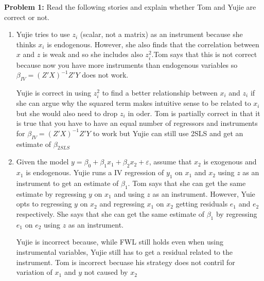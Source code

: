 \documentclass[11pt]{SelfArxOneColBMN}
\affiliation{\textsuperscript{1}\textit{John E. Walker Department of Economics,
Clemson University,Clemson, SC: email ijdavis@g.clemson.edu}}
\date{\small{Version ~\today}}
\begin{document}
\flushbottom

\maketitle

\textbf{Problem 1:} Read the following stories and explain whether Tom and Yujie are correct or not.
\begin{enumerate}
  \item Yujie tries to use $z_i$ (scalar, not a matrix) as an instrument because she thinks $x_i$ is endogenous. However, she also finds that the correlation between $x$ and $z$ is weak and so she includes also $z_i^2$.Tom says that this is not correct because now you have more instruments than endogenous variables so $\beta_{IV} = (Z'X)^{-1}Z'Y$ does not work.
  
  \begin{solution}
    Yujie is correct in using $z_i^2$ to find a better relationship between $x_i$ and $z_i$ if she can argue why the squared term makes intuitive sense to be related to $x_i$ but she would also need to drop $z_i$ in oder. Tom is partially correct in that it is true that you have to have an equal number of regressors and instruments for $\beta_{IV} = (Z'X)^{-1}Z'Y$ to work but Yujie can still use 2SLS and get an estimate of $\beta_{2SLS}$
  \end{solution}
  
  \item Given the model $y = \beta_0 + \beta_1x_1 + \beta_2x_2 + \varepsilon$, assume that $x_2$ is exogenous and $x_1$ is endogenous. Yujie runs a IV regression of $y_1$ on $x_1$ and $x_2$ using $z$ as an instrument to get an estimate of $\beta_1$. Tom says that she can get the same estimate by regressing $y$ on $x_1$ and using $z$ as an instrument. However, Yuie opts to regressing $y$ on $x_2$ and regressing $x_1$ on $x_2$ getting residuals $e_1$ and $e_2$ respectively. She says that she can get the same estimate of $\beta_1$ by regressing $e_1$ on $e_2$ using $z$ as an instrument.
  
  \begin{solution}
    Yujie is incorrect because, while FWL still holds even when using instrumental variables, Yujie still has to get a residual related to the instrument. Tom is incorrect becuase his strategy does not contril for variation of $x_1$ and $y$ not caused by $x_2$
  \end{solution}
  

\end{enumerate}
\end{document}

